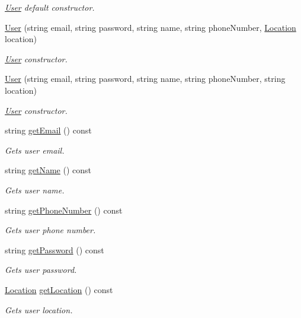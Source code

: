 \begin{DoxyCompactItemize}
\begin{DoxyCompactList}\small\item\em \hyperlink{class_user}{User} default constructor. \end{DoxyCompactList}\item 
\hyperlink{class_user_a7cc314f439fc19daa7303aa31f3e6798}{User} (string email, string password, string name, string phone\+Number, \hyperlink{class_location}{Location} location)
\begin{DoxyCompactList}\small\item\em \hyperlink{class_user}{User} constructor. \end{DoxyCompactList}\item 
\hyperlink{class_user_aa0732588c5bd4db4f7f6310e788abacf}{User} (string email, string password, string name, string phone\+Number, string location)
\begin{DoxyCompactList}\small\item\em \hyperlink{class_user}{User} constructor. \end{DoxyCompactList}\item 
string \hyperlink{class_user_ac8a15550f3596a7ef13eb31b82a8ecf6}{get\+Email} () const 
\begin{DoxyCompactList}\small\item\em Gets user email. \end{DoxyCompactList}\item 
string \hyperlink{class_user_a2b2a3d00d303affb4f5674bc9788db52}{get\+Name} () const 
\begin{DoxyCompactList}\small\item\em Gets user name. \end{DoxyCompactList}\item 
string \hyperlink{class_user_a4d59412a7d7411dd8c8127adc9e80fae}{get\+Phone\+Number} () const 
\begin{DoxyCompactList}\small\item\em Gets user phone number. \end{DoxyCompactList}\item 
string \hyperlink{class_user_a3f39e6b48da6b769692bf71f26104a6a}{get\+Password} () const 
\begin{DoxyCompactList}\small\item\em Gets user password. \end{DoxyCompactList}\item 
\hyperlink{class_location}{Location} \hyperlink{class_user_a7c2072cbf540ae1bd47992b40783843c}{get\+Location} () const 
\begin{DoxyCompactList}\small\item\em Gets user location. \end{DoxyCompactList}\item 

\end{DoxyCompactItemize}
